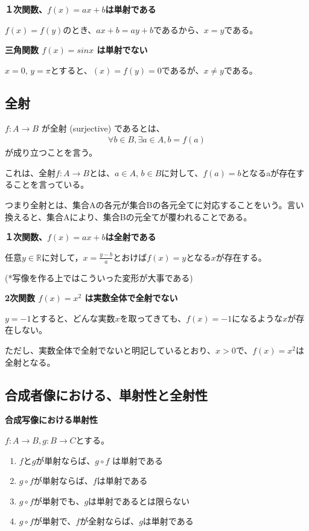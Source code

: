 \documentclass[dvipdfmx,autodetect-engine]{jsarticle}
\begin{document}
\exam

{\bf １次関数、$f(x) = ax+b$は単射である }

$f(x) = f(y)$のとき、$ax+b = ay+b$であるから、$x=y$である。

\exam
{\bf 三角関数 $f(x) = sinx$ は単射でない }

$x=0$, $y=\pi$とすると、$(x) = f(y) =0$であるが、$x \neq y$である。

\subsection{全射}

$f: A \to B$ が全射 (surjective) であるとは、
\begin{eqnarray*}
\forall b \in B, \exists a \in A, b = f(a)
\end{eqnarray*}
が成り立つことを言う。

これは、全射$f: A \to B$とは、$a \in A$, $b \in B$に対して、$f(a) = b$となるaが存在することを言っている。

つまり全射とは、集合Aの各元が集合Bの各元全てに対応することをいう。言い換えると、集合Aにより、集合Bの元全てが覆われることである。

\exam

{\bf １次関数、$f(x) = ax+b$は全射である}

任意$y \in \mathbb{R}$に対して，$x = \frac{y-b}{a}$とおけば$f(x) = y$となる$x$が存在する。

(*写像を作る上ではこういった変形が大事である)


\exam
{\bf 2次関数 $f(x)=x^2$ は実数全体で全射でない}

$y=-1$とすると、どんな実数$x$を取ってきても、$f(x) = -1$になるような$x$が存在しない。

ただし、実数全体で全射でないと明記しているとおり、$x > 0$で、$f(x)=x^2$は全射となる。


\subsection{合成者像における、単射性と全射性}

\prop
\label{eq:injectiveProposition}

 {\bf 合成写像における単射性 }
 
 $f:A \to B, g: B \to C$とする。

\begin{enumerate}
\renewcommand{\labelenumi}{(\arabic{enumi})}
	\item $f$と$g$が単射ならば、$g \circ f$ は単射である
	\item $g \circ f$が単射ならば、$f$は単射である
	\item $g \circ f$が単射でも、$g$は単射であるとは限らない
	\item $g \circ f$が単射で、$f$が全射ならば、$g$は単射である
\end{enumerate}
\end{document}

